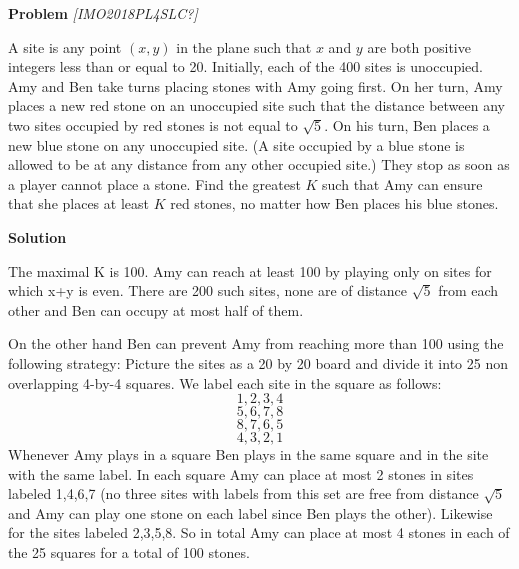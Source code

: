 \begin{problem}


\textbf{Problem}
\textit{[IMO2018PL4SLC?]}


A site is any point $(x, y)$ in the plane such that $x$ and $y$ are both positive integers less than or equal to 20. Initially, each of the 400 sites is unoccupied. Amy and Ben take turns placing stones with Amy going first. On her turn, Amy places a new red stone on an unoccupied site such that the distance between any two sites occupied by red stones is not equal to $\sqrt{5}$. On his turn, Ben places a new blue stone on any unoccupied site. (A site occupied by a blue stone is allowed to be at any distance from any other occupied site.) They stop as soon as a player cannot place a stone. Find the greatest $K$ such that Amy can ensure that she places at least $K$ red stones, no matter how Ben places his blue stones.

\textbf{Solution}

The maximal K is 100. Amy can reach at least 100 by playing only on sites for which x+y is even. There are 200 such sites, none are of distance $\sqrt{5}$ from each other and Ben can occupy at most half of them. 

On the other hand Ben can prevent Amy from reaching more than 100 using the following strategy: Picture the sites as a 20 by 20 board and divide it into 25 non overlapping 4-by-4 squares. We label each site in the square as follows:\[1, 2, 3, 4\]\[5, 6, 7, 8\]\[8, 7, 6, 5\]\[4, 3, 2, 1\]
Whenever Amy plays in a square Ben plays in the same square and in the site with the same label. In each square Amy can place at most 2 stones in sites labeled 1,4,6,7 (no three sites with labels from this set are free from distance $\sqrt{5}$ and Amy can play one stone on each label since Ben plays the other). Likewise for the sites labeled 2,3,5,8. So in total Amy can place at most 4 stones in each of the 25 squares for a total of 100 stones.
\end{problem}
\filbreak
